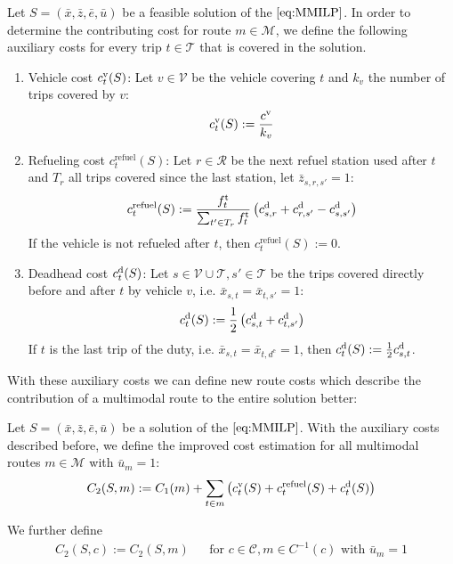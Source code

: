 Let $S=\left(\bar{x},\bar{z},\bar{e},\bar{u}\right)$ be a feasible solution of the $\eqref{eq:MMILP}$. In order to determine the contributing cost for route $m\in\mathcal{M}$, we define the following auxiliary costs for every trip $t\in\mathcal{T}$ that is covered in the solution.
\begin{enumerate}
	\item{Vehicle cost $c^{\operatorname{v}}_t(S)$:}
Let $v\in\mathcal{V}$ be the vehicle covering $t$ and $k_v$ the number of trips covered by $v$:
\begin{align*}
	c^{\operatorname{v}}_t(S) := \frac{c^{\operatorname{v}}}{k_v}
\end{align*}
	\item{Refueling cost $c^{\operatorname{refuel}}_t(S)$:}
Let $r\in\mathcal{R}$ be the next refuel station used after $t$ and $T_r$ all trips covered since the last station, let $\bar{z}_{s,r,s'} = 1$:
\begin{align*}
	c^{\operatorname{refuel}}_t(S) := \frac{f^{\operatorname{t}}_t}{\sum_{t'\in T_r} f^{\operatorname{t}}_t}\left(c^{\operatorname{d}}_{s,r}+c^{\operatorname{d}}_{r,s'}-c^{\operatorname{d}}_{s,s'}\right)
\end{align*}
If the vehicle is not refueled after $t$, then $c^{\operatorname{refuel}}_t(S) := 0$.
	\item{Deadhead cost $c^{\operatorname{d}}_t(S)$:}
Let $s\in\mathcal{V}\cup\mathcal{T},s'\in\mathcal{T}$ be the trips covered directly before and after $t$ by vehicle $v$, i.e. $\bar{x}_{s,t}=\bar{x}_{t,s'}=1$:
\begin{align*}
	c^{\operatorname{d}}_t(S) := \frac 1 2 \left(c^{\operatorname{d}}_{s,t}+c^{\operatorname{d}}_{t,s'}\right)
\end{align*}
If $t$ is the last trip of the duty, i.e. $\bar{x}_{s,t}=\bar{x}_{t,d^{\operatorname{e}}}=1$, then $c^{\operatorname{d}}_t(S) := \frac 1 2 c^{\operatorname{d}}_{s,t}$.
\end{enumerate}

With these auxiliary costs we can define new route costs which describe the contribution of a multimodal route to the entire solution better:

\begin{definition}

Let $S=\left(\bar{x},\bar{z},\bar{e},\bar{u}\right)$ be a solution of the $\eqref{eq:MMILP}$. With the auxiliary costs described before, we define the improved cost estimation for all multimodal routes ${m\in\mathcal{M}}$ with ${\bar{u}_m=1}$:
\begin{align*}
	C_2(S,m) := C_1(m) + \sum_{t\in m}\left(c^{\operatorname{v}}_t(S) + c^{\operatorname{refuel}}_t(S) + c^{\operatorname{d}}_t(S)\right)
\end{align*}

We further define
\begin{align*}
	C_2(S,c) := C_2(S,m) && \text{for } c\in\mathcal{C},m\in C^{-1}(c) \text{ with } \bar{u}_m = 1
\end{align*}

\end{definition}

